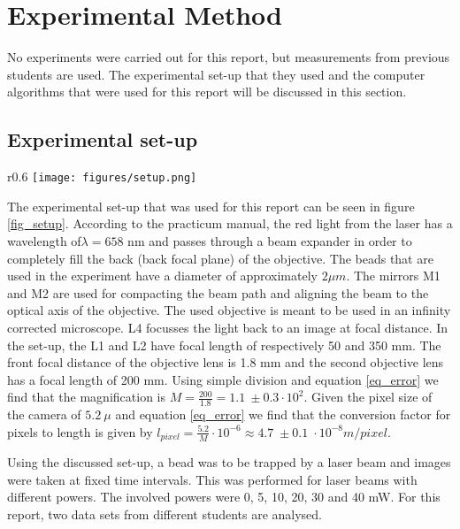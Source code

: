 \section{Experimental Method}

No experiments were carried out for this report, but measurements from previous students are used. The experimental set-up that they used and the computer algorithms that were used for this report will be discussed in this section.

\subsection{Experimental set-up}

\begin{wrapfigure}{r}{0.6\textwidth}
    \centering
    \texttt{[image: figures/setup.png]}
    \caption{Schematic diagram of the experimental set-up that was used for the experiments corresponding with the treated data in this report. This diagram was taken from the practicum manual \cite{practicum_manual}.}
    \label{fig_setup}
\end{wrapfigure}


The experimental set-up that was used for this report can be seen in figure \ref{fig_setup}.
According to the practicum manual, the red light from the laser has a wavelength of$\lambda=658$ nm and passes through a beam expander in order to completely fill the back (back focal plane) of the objective.
The beads that are used in the experiment have a diameter of approximately $ 2 \mu m$.
The mirrors M1 and M2 are used for compacting the beam path and aligning the beam to the optical axis of the objective.
The used objective is meant to be used in an infinity corrected microscope.
L4 focusses the light back to an image at focal distance.
In the set-up, the L1 and L2 have focal length of respectively 50 and 350 mm. The front focal distance of the objective lens is 1.8 mm and the second objective lens has a focal length of 200 mm. Using simple division and equation \ref{eq_error} we find that the magnification is  $ M = \frac{200}{1.8} = 1.1  \: \pm 0.3 \cdot 10^2$. Given the pixel size of the camera of $ 5.2 \: \mu $  and equation  \ref{eq_error} we find that the conversion factor for pixels to length is given by $l_{pixel} = \frac{5.2}{M} \cdot 10^{-6} \approx 4.7 \; \pm 0.1 \; \cdot 10^{-8} m/pixel$.

Using the discussed set-up, a bead was to be trapped by a laser beam and images were taken at fixed time intervals. This was performed for laser beams with different powers. The involved powers were 0, 5, 10, 20, 30 and 40 mW. For this report, two data sets from different students are analysed.

